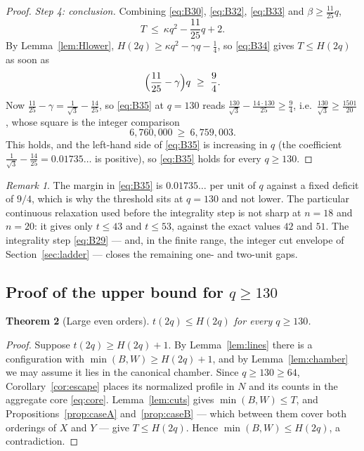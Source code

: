 \documentclass[11pt]{amsart}
\newtheorem{theorem}{Theorem}
\theoremstyle{definition}
\theoremstyle{remark}
\newtheorem{remark}[theorem]{Remark}
\begin{document}
\begin{proof}
\emph{Step 4: conclusion.} Combining \eqref{eq:B30}, \eqref{eq:B32}, \eqref{eq:B33} and $\beta\ge\frac{11}{25}q$,
\begin{equation}\label{eq:B34}
T\ \le\ \kappa q^2-\frac{11}{25}q+2 .
\end{equation}
By Lemma~\ref{lem:Hlower}, $H(2q)\ge\kappa q^2-\gamma q-\frac14$, so \eqref{eq:B34} gives $T\le H(2q)$ as soon as
\begin{equation}\label{eq:B35}
\Bigl(\frac{11}{25}-\gamma\Bigr)q\ \ge\ \frac94 .
\end{equation}
Now $\frac{11}{25}-\gamma=\frac1{\sqrt3}-\frac{14}{25}$, so \eqref{eq:B35} at $q=130$ reads $\frac{130}{\sqrt3}-\frac{14\cdot130}{25}\ge\frac94$, i.e.\ $\frac{130}{\sqrt3}\ge\frac{1501}{20}$, whose square is the integer comparison
\[
6{,}760{,}000\ \ge\ 6{,}759{,}003 .
\]
This holds, and the left-hand side of \eqref{eq:B35} is increasing in $q$ (the coefficient $\frac1{\sqrt3}-\frac{14}{25}=0.01735\ldots$ is positive), so \eqref{eq:B35} holds for every $q\ge130$.
\end{proof}

\begin{remark}\label{rem:integrality}
The margin in \eqref{eq:B35} is $0.01735\ldots$ per unit of $q$ against a fixed deficit of $9/4$, which is why the threshold sits at $q=130$ and not lower.  The particular continuous relaxation used before the integrality step is not sharp at $n=18$ and $n=20$: it gives only $t\le43$ and $t\le53$, against the exact values $42$ and $51$.  The integrality step \eqref{eq:B29} --- and, in the finite range, the integer cut envelope of Section~\ref{sec:ladder} --- closes the remaining one- and two-unit gaps.
\end{remark}

\subsection{Proof of the upper bound for \texorpdfstring{$q\ge130$}{q >= 130}}

\begin{theorem}[Large even orders]\label{thm:q130}
$t(2q)\le H(2q)$ for every $q\ge130$.
\end{theorem}

\begin{proof}
Suppose $t(2q)\ge H(2q)+1$. By Lemma~\ref{lem:lines} there is a configuration with $\min(B,W)\ge H(2q)+1$, and by Lemma~\ref{lem:chamber} we may assume it lies in the canonical chamber. Since $q\ge130\ge64$, Corollary~\ref{cor:escape} places its normalized profile in $N$ and its counts in the aggregate core \eqref{eq:core}. Lemma~\ref{lem:cuts} gives $\min(B,W)\le T$, and Propositions~\ref{prop:caseA} and~\ref{prop:caseB} --- which between them cover both orderings of $X$ and $Y$ --- give $T\le H(2q)$. Hence $\min(B,W)\le H(2q)$, a contradiction.
\end{proof}
\end{document}

